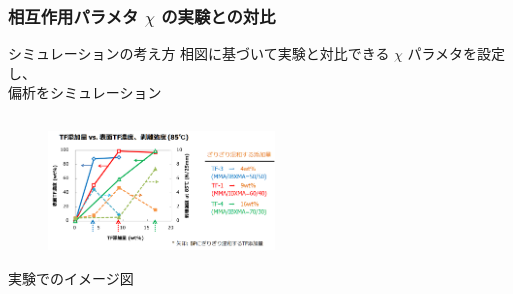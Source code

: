 \documentclass[12pt, dvipdfmx]{beamer}
\begin{document}
\begin{frame}\frametitle{相互作用パラメタ $\chi$ の実験との対比}

\begin{alertblock}{シミュレーションの考え方}
相図に基づいて実験と対比できる $\chi$ パラメタを設定し、\\
偏析をシミュレーション
\end{alertblock}

\begin{columns}
	\begin{column}{6.0cm}
		\vspace{-0.5\baselineskip}
		\begin{figure}[htbp]
			\begin{center}
				\includegraphics[width=60mm]{nakamura-2.png}
			\end{center}
		\end{figure}
		\begin{center}
			\vspace{-0.5\baselineskip}
			{\footnotesize 実験でのイメージ図}
		\end{center}
	\end{column}
	\begin{column}{6.0cm}
		\vspace{-1\baselineskip}

\end{column}
\end{columns}
\end{frame}
\end{document}
